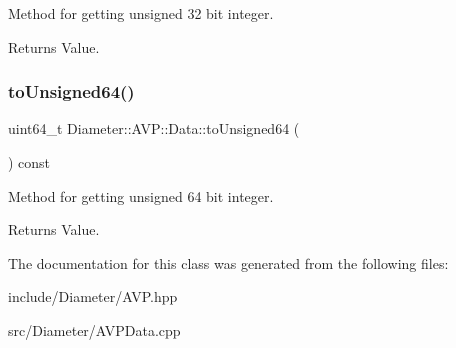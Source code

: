 Method for getting unsigned 32 bit integer. 

\begin{DoxyReturn}{Returns}
Value. 
\end{DoxyReturn}
\mbox{\label{classDiameter_1_1AVP_1_1Data_a57371b621b2e27eb2988b232f5a84a43}} 
\subsubsection{\texorpdfstring{to\+Unsigned64()}{toUnsigned64()}}
{\footnotesize\ttfamily uint64\+\_\+t Diameter\+::\+A\+V\+P\+::\+Data\+::to\+Unsigned64 (\begin{DoxyParamCaption}{ }\end{DoxyParamCaption}) const}



Method for getting unsigned 64 bit integer. 

\begin{DoxyReturn}{Returns}
Value. 
\end{DoxyReturn}


The documentation for this class was generated from the following files\+:\begin{DoxyCompactItemize}
\item 
include/\+Diameter/A\+V\+P.\+hpp\item 
src/\+Diameter/A\+V\+P\+Data.\+cpp\end{DoxyCompactItemize}
